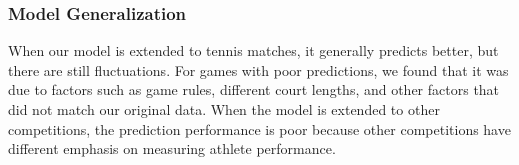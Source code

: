 \subsubsection{Model Generalization}
When our model is extended to tennis matches, it generally predicts better, but there are still fluctuations. For games with poor predictions, we found that it was due to factors such as game rules, different court lengths, and other factors that did not match our original data. When the model is extended to other competitions, the prediction performance is poor because other competitions have different emphasis on measuring athlete performance.
